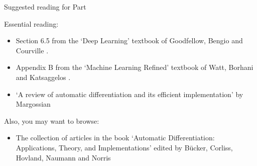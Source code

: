 
\begin{frame}{Suggested reading for Part \thispart}

    {
    \small
    Essential reading:
    \begin{itemize}
        \scriptsize
        \item Section 6.5 from the `Deep Learning' textbook of Goodfellow, Bengio and Courville \cite{Goodfellow:2017MITDL}.
        \item Appendix B from the `Machine Learning Refined' textbook of Watt, Borhani and Katsaggelos \cite{Watt:2016Cambridge}.
        \item `A review of automatic differentiation and its efficient implementation' by Margossian \cite{Margossian:2019ad}
    \end{itemize}
    
    Also, you may want to browse:
    \begin{itemize}
        \scriptsize
        \item The collection of articles
         in the book `Automatic Differentiation: Applications, Theory, and Implementations'
         edited by B{\"u}cker, Corliss, Hovland, Naumann and Norris \cite{Bucker:2005ABo}
    \end{itemize}
    }

\end{frame}